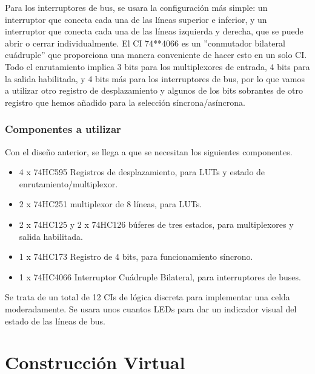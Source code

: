 \documentclass[12pt]{article}
\begin{document}
Para los interruptores de bus, se usara la configuración más simple: un interruptor que conecta cada una de las líneas superior e inferior, y un interruptor que conecta cada una de las líneas izquierda y derecha, que se puede abrir o cerrar individualmente. El CI 74**4066 es un ''conmutador bilateral cuádruple'' que proporciona una manera conveniente de hacer esto en un solo CI. Todo el enrutamiento implica 3 bits para los multiplexores de entrada, 4 bits para la salida habilitada, y 4 bits más para los interruptores de bus, por lo que vamos a utilizar otro registro de desplazamiento y algunos de los bits sobrantes de otro registro que hemos añadido para la selección síncrona/asíncrona.

\subsubsection{Componentes a utilizar}

Con el diseño anterior, se llega a que se necesitan los siguientes componentes. 
 
\begin{itemize} 
  \item 4 x 74HC595 Registros de desplazamiento, para LUTs y estado de enrutamiento/multiplexor. 
  \item 2 x 74HC251 multiplexor de 8 líneas, para LUTs. 
  \item 2 x 74HC125 y 2 x 74HC126 búferes de tres estados, para multiplexores y salida habilitada. 
  \item 1 x 74HC173 Registro de 4 bits, para funcionamiento síncrono. 
  \item 1 x 74HC4066 Interruptor Cuádruple Bilateral, para interruptores de buses. 
\end{itemize} 
  
Se trata de un total de 12 CIs de lógica discreta para implementar una celda moderadamente. Se usara unos cuantos LEDs para dar un indicador visual del estado de las líneas de bus.

\section{Construcción Virtual}
\end{document}
